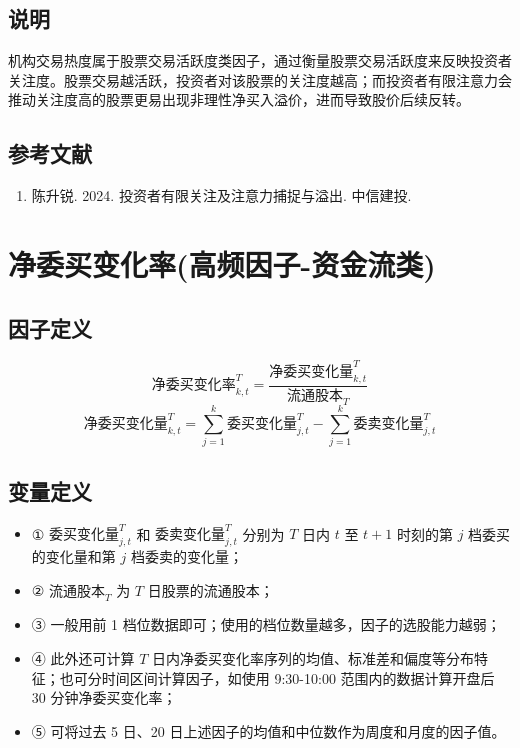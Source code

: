 \documentclass{article}
\begin{document}
\subsection{说明}
机构交易热度属于股票交易活跃度类因子，通过衡量股票交易活跃度来反映投资者关注度。股票交易越活跃，投资者对该股票的关注度越高；而投资者有限注意力会推动关注度高的股票更易出现非理性净买入溢价，进而导致股价后续反转。

\subsection{参考文献}
\begin{enumerate}
    \item 陈升锐. 2024. 投资者有限关注及注意力捕捉与溢出. 中信建投.
\end{enumerate}

\section{净委买变化率(高频因子-资金流类)}

\subsection{因子定义}
\begin{equation}
    \text{净委买变化率}^{T}_{k,t} = \frac{\text{净委买变化量}^{T}_{k,t}}{\text{流通股本}_{T}}
\end{equation}
\begin{equation}
    \text{净委买变化量}^{T}_{k,t} = \sum_{j=1}^{k}  \text{委买变化量}^{T}_{j,t} - \sum_{j=1}^{k}\text{委卖变化量}_{j,t}^T 
\end{equation}

\subsection{变量定义}
\begin{itemize}
    \item ① \(\text{委买变化量}^{T}_{j,t}\) 和 \(\text{委卖变化量}^{T}_{j,t}\) 分别为 \(T\) 日内 \(t\) 至 \(t+1\) 时刻的第 \(j\) 档委买的变化量和第 \(j\) 档委卖的变化量；
    \item ② \(\text{流通股本}_{T}\) 为 \(T\) 日股票的流通股本；
    \item ③ 一般用前 1 档位数据即可；使用的档位数量越多，因子的选股能力越弱；
    \item ④ 此外还可计算 \(T\) 日内净委买变化率序列的均值、标准差和偏度等分布特征；也可分时间区间计算因子，如使用 9:30-10:00 范围内的数据计算开盘后 30 分钟净委买变化率；
    \item ⑤ 可将过去 5 日、20 日上述因子的均值和中位数作为周度和月度的因子值。
\end{itemize}
\end{document}
